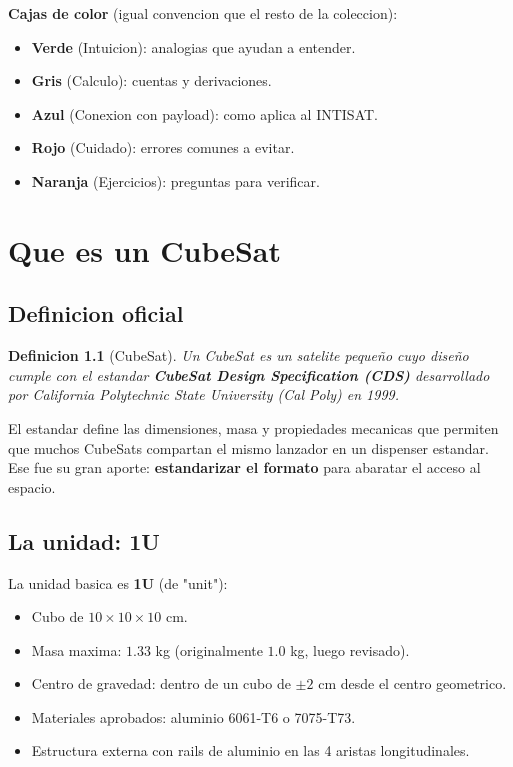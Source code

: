 \documentclass[11pt,a4paper,oneside,openright]{book}
\newtheorem{definicion}{Definicion}[chapter]
\begin{document}
\textbf{Cajas de color} (igual convencion que el resto de la coleccion):
\begin{itemize}[leftmargin=2em]
  \item \textbf{Verde} (Intuicion): analogias que ayudan a entender.
  \item \textbf{Gris} (Calculo): cuentas y derivaciones.
  \item \textbf{Azul} (Conexion con payload): como aplica al INTISAT.
  \item \textbf{Rojo} (Cuidado): errores comunes a evitar.
  \item \textbf{Naranja} (Ejercicios): preguntas para verificar.
\end{itemize}

\tableofcontents

\mainmatter

\chapter{Que es un CubeSat}
\label{ch:que-es}

\section{Definicion oficial}

\begin{definicion}[CubeSat]
Un \emph{CubeSat} es un satelite pequeño cuyo diseño cumple con el
estandar \textbf{CubeSat Design Specification (CDS)} desarrollado por
California Polytechnic State University (Cal Poly) en 1999.
\end{definicion}

El estandar define las dimensiones, masa y propiedades mecanicas que
permiten que muchos CubeSats compartan el mismo lanzador en un dispenser
estandar. Ese fue su gran aporte: \textbf{estandarizar el formato} para
abaratar el acceso al espacio.

\section{La unidad: 1U}

La unidad basica es \textbf{1U} (de "unit"):

\begin{itemize}[leftmargin=2em]
  \item Cubo de $10 \times 10 \times 10$ cm.
  \item Masa maxima: $1.33$ kg (originalmente $1.0$ kg, luego revisado).
  \item Centro de gravedad: dentro de un cubo de $\pm 2$ cm desde el centro
        geometrico.
  \item Materiales aprobados: aluminio 6061-T6 o 7075-T73.
  \item Estructura externa con rails de aluminio en las 4 aristas
        longitudinales.
\end{itemize}
\end{document}
